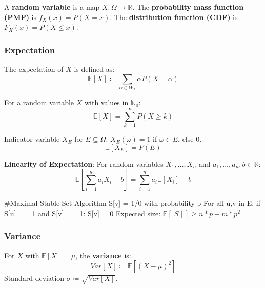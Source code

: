 \begin{definition}
	A \textbf{random variable} is a map $X: \Omega \to \mathbb{R}$.
	The \textbf{probability mass function (PMF)} is $f_X(x) = P(X=x)$.
	The \textbf{distribution function (CDF)} is $F_X(x) = P(X \leq x)$.
\end{definition}

\subsubsection{Expectation}

\begin{definition}
	The expectation of $X$ is defined as:
	$$\mathbb{E}[X] \coloneqq \sum_{\alpha \in W_x} \alpha P(X=\alpha)$$
\end{definition}

\begin{theorem}
	For a random variable $X$ with values in $\mathbb{N}_0$:
	$$\mathbb{E}[X] = \sum_{k=1}^\infty P(X \geq k)$$
\end{theorem}

\begin{definition}
	Indicator-variable $X_E$ for $E \subseteq \Omega$:
	$X_E(\omega) = 1$ if $\omega \in E$, else $0$.
	$$\mathbb{E}[X_E] = P(E)$$
\end{definition}

\begin{theorem}
	\textbf{Linearity of Expectation}:
	For random variables $X_1, \dots, X_n$ and $a_1, \dots, a_n, b \in \mathbb{R}$:
	$$\mathbb{E}[\sum_{i=1}^n a_i X_i + b] = \sum_{i=1}^n a_i \mathbb{E}[X_i] + b$$
\end{theorem}

\begin{algorithm}
	#Maximal Stable Set Algorithm
	S[v] = 1/0 with probability p
	For all {u,v} in E:
	if S[u] == 1 and S[v] == 1: S[v] = 0
	Expected size: $\mathbb{E}[\mid S \mid] \geq n*p - m*p^2$
\end{algorithm}

\subsubsection{Variance}

\begin{definition}
	For $X$ with $\mathbb{E}[X] = \mu$, the \textbf{variance} is:
	$$Var[X] \coloneqq \mathbb{E}[(X-\mu)^2]$$
	Standard deviation $\sigma \coloneqq \sqrt{Var[X]}$.
\end{definition}

